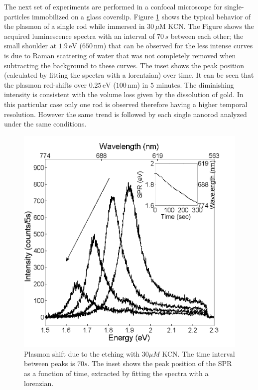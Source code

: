\documentclass[twocolumn]{article}
\begin{document}
The next set of experiments are performed in a confocal microscope for
single-particles immobilized on a glass coverslip. Figure
\ref{fig:plasmon_single_rod} shows the typical behavior of the plasmon of a
single rod while immersed in $30\,\mu\textrm{M}$ KCN. The Figure shows the
acquired luminescence spectra with an interval of $70\,s$ between each other;
the small shoulder at $1.9\,\textrm{eV}$ ($650\,\textrm{nm}$) that can be
observed for the less intense curves is due to Raman scattering of water that
was not completely removed when subtracting the background to these curves. 
The inset shows the peak position (calculated by fitting the spectra with a
lorentzian) over time. It can be seen that the plasmon red-shifts over
$0.25\,\textrm{eV}$ ($100\,\textrm{nm}$) in $5$ minutes. The diminishing
intensity is consistent with the volume loss given by the dissolution of gold.
In this particular case only one rod is observed therefore having a higher
temporal resolution. However the same trend is followed by each single nanorod
analyzed under the same conditions.


\begin{figure}[tp]
 \centering
 \includegraphics[width=0.95\linewidth]{plasmon_single_rod.png}
 \caption{Plasmon shift due to the etching with $30\mu M$ KCN. The time
 interval between peaks is $70s$. The inset shows the peak position of the SPR as a
 function of time, extracted by fitting the spectra with a lorenzian.}
 \label{fig:plasmon_single_rod}
\end{figure}
\end{document}
